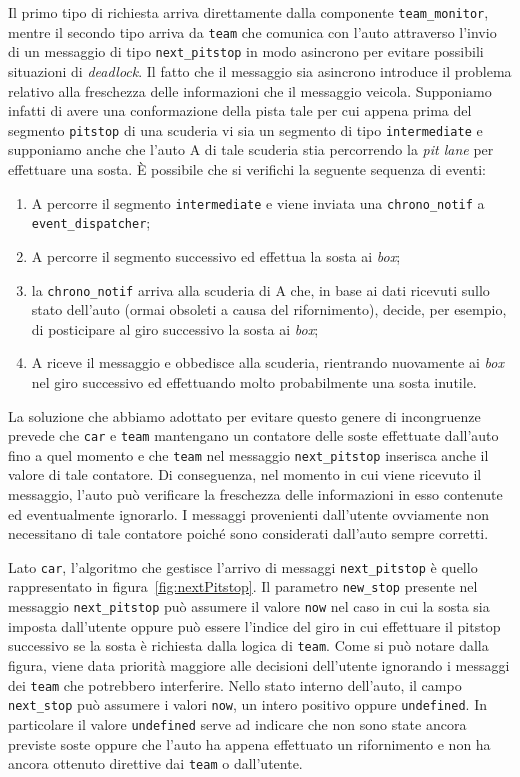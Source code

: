 \documentclass[a4paper]{report}
\newcommand{\fun}[1]{\texttt{#1}}
\begin{document}
Il primo tipo di richiesta arriva direttamente dalla componente \texttt{team\_monitor}, mentre il secondo tipo arriva da \texttt{team} che comunica con l'auto attraverso l'invio di un messaggio di tipo \texttt{next\_pitstop} in modo asincrono per evitare possibili situazioni di \textit{deadlock}. Il fatto che il messaggio sia asincrono introduce il problema relativo alla freschezza delle informazioni che il messaggio veicola. Supponiamo infatti di avere una conformazione della pista tale per cui appena prima del segmento \texttt{pitstop} di una scuderia vi sia un segmento di tipo \texttt{intermediate} e supponiamo anche che l'auto A di tale scuderia stia percorrendo la \textit{pit lane} per effettuare una sosta.
\`E possibile che si verifichi la seguente sequenza di eventi:
\begin{enumerate}
\item A percorre il segmento \texttt{intermediate} e viene inviata una \texttt{chrono\_notif} a \texttt{event\_dispatcher};
\item A percorre il segmento successivo ed effettua la sosta ai \textit{box};
\item la \texttt{chrono\_notif} arriva alla scuderia di A che, in base ai dati ricevuti sullo stato dell'auto (ormai obsoleti a causa del rifornimento), decide, per esempio, di posticipare al giro successivo la sosta ai \textit{box};
\item A riceve il messaggio e obbedisce alla scuderia, rientrando nuovamente ai \textit{box} nel giro successivo ed effettuando molto probabilmente una sosta inutile.
\end{enumerate}

La soluzione che abbiamo adottato per evitare questo genere di incongruenze prevede che \texttt{car} e \texttt{team} mantengano un contatore delle soste effettuate dall'auto fino a quel momento e che \texttt{team} nel messaggio \fun{next\_pitstop} inserisca anche il valore di tale contatore. Di conseguenza, nel momento in cui viene ricevuto il messaggio, l'auto può verificare la freschezza delle informazioni in esso contenute ed eventualmente ignorarlo. I messaggi provenienti dall'utente ovviamente non necessitano di tale contatore poiché sono considerati dall'auto sempre corretti.

Lato \texttt{car}, l'algoritmo che gestisce l'arrivo di messaggi \fun{next\_pitstop} è quello rappresentato in figura~\ref{fig:nextPitstop}. Il parametro \fun{new\_stop} presente nel messaggio \fun{next\_pitstop} può assumere il valore \fun{now} nel caso in cui la sosta sia imposta dall'utente oppure può essere l'indice del giro in cui effettuare il pitstop successivo se la sosta è richiesta dalla logica di \texttt{team}. Come si può notare dalla figura, viene data priorità maggiore alle decisioni dell'utente ignorando i messaggi dei \texttt{team} che potrebbero interferire. Nello stato interno dell'auto, il campo \fun{next\_stop} può assumere i valori \fun{now}, un intero positivo oppure \fun{undefined}. In particolare il valore \fun{undefined} serve ad indicare che non sono state ancora previste soste oppure che l'auto ha appena effettuato un rifornimento e non ha ancora ottenuto direttive dai \texttt{team} o dall'utente.
\end{document}
